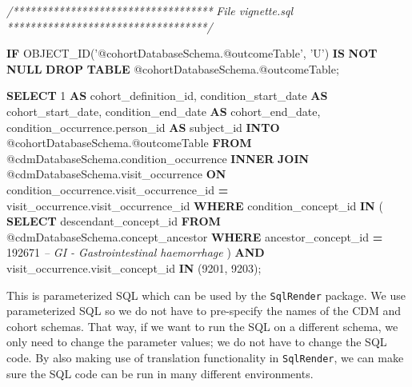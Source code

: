 \documentclass[
]{article}
\newenvironment{Shaded}{\begin{snugshade}}{\end{snugshade}}
\newcommand{\CommentTok}[1]{\textcolor[rgb]{0.56,0.35,0.01}{\textit{#1}}}
\newcommand{\ControlFlowTok}[1]{\textcolor[rgb]{0.13,0.29,0.53}{\textbf{#1}}}
\newcommand{\DecValTok}[1]{\textcolor[rgb]{0.00,0.00,0.81}{#1}}
\newcommand{\KeywordTok}[1]{\textcolor[rgb]{0.13,0.29,0.53}{\textbf{#1}}}
\newcommand{\NormalTok}[1]{#1}
\newcommand{\OperatorTok}[1]{\textcolor[rgb]{0.81,0.36,0.00}{\textbf{#1}}}
\newcommand{\StringTok}[1]{\textcolor[rgb]{0.31,0.60,0.02}{#1}}
\begin{document}
\begin{Shaded}
\begin{Highlighting}[]
\CommentTok{/***********************************}
\CommentTok{File vignette.sql }
\CommentTok{***********************************/}

\ControlFlowTok{IF}\NormalTok{ OBJECT_ID(}\StringTok{'@cohortDatabaseSchema.@outcomeTable'}\NormalTok{, }\StringTok{'U'}\NormalTok{) }\KeywordTok{IS} \KeywordTok{NOT} \KeywordTok{NULL}
  \KeywordTok{DROP} \KeywordTok{TABLE}\NormalTok{ @cohortDatabaseSchema.@outcomeTable;}

\KeywordTok{SELECT} \DecValTok{1} \KeywordTok{AS}\NormalTok{ cohort_definition_id,}
\NormalTok{    condition_start_date }\KeywordTok{AS}\NormalTok{ cohort_start_date,}
\NormalTok{    condition_end_date }\KeywordTok{AS}\NormalTok{ cohort_end_date,}
\NormalTok{    condition_occurrence.person_id }\KeywordTok{AS}\NormalTok{ subject_id}
\KeywordTok{INTO}\NormalTok{ @cohortDatabaseSchema.@outcomeTable}
\KeywordTok{FROM}\NormalTok{ @cdmDatabaseSchema.condition_occurrence}
\KeywordTok{INNER} \KeywordTok{JOIN}\NormalTok{ @cdmDatabaseSchema.visit_occurrence}
    \KeywordTok{ON}\NormalTok{ condition_occurrence.visit_occurrence_id }\OperatorTok{=}\NormalTok{ visit_occurrence.visit_occurrence_id}
\KeywordTok{WHERE}\NormalTok{ condition_concept_id }\KeywordTok{IN}\NormalTok{ (}
        \KeywordTok{SELECT}\NormalTok{ descendant_concept_id}
        \KeywordTok{FROM}\NormalTok{ @cdmDatabaseSchema.concept_ancestor}
        \KeywordTok{WHERE}\NormalTok{ ancestor_concept_id }\OperatorTok{=} \DecValTok{192671} \CommentTok{-- GI - Gastrointestinal haemorrhage}
\NormalTok{        )}
    \KeywordTok{AND}\NormalTok{ visit_occurrence.visit_concept_id }\KeywordTok{IN}\NormalTok{ (}\DecValTok{9201}\NormalTok{, }\DecValTok{9203}\NormalTok{);}
\end{Highlighting}
\end{Shaded}

This is parameterized SQL which can be used by the \texttt{SqlRender}
package. We use parameterized SQL so we do not have to pre-specify the
names of the CDM and cohort schemas. That way, if we want to run the SQL
on a different schema, we only need to change the parameter values; we
do not have to change the SQL code. By also making use of translation
functionality in \texttt{SqlRender}, we can make sure the SQL code can
be run in many different environments.
\end{document}
